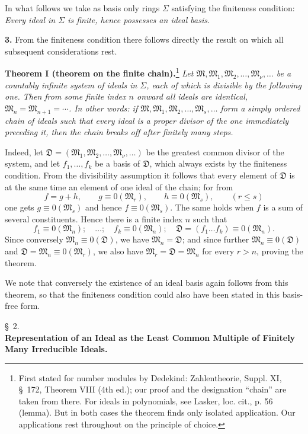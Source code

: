 \documentclass[11pt]{article}
\providecommand{\ideal}[1]{\mathfrak{#1}}
\begin{document}
In what follows we take as basis only rings $\Sigma$ satisfying the finiteness condition: \emph{Every ideal in $\Sigma$ is finite, hence possesses an ideal basis.}

\textbf{3.} From the finiteness condition there follows directly the result on which all subsequent considerations rest.

\textbf{Theorem I (theorem on the finite chain).}\footnote{First stated for number modules by Dedekind: Zahlentheorie, Suppl. XI, \S~172, Theorem VIII (4th ed.); our proof and the designation ``chain'' are taken from there. For ideals in polynomials, see Lasker, loc. cit., p. 56 (lemma). But in both cases the theorem finds only isolated application. Our applications rest throughout on the principle of choice.} \emph{Let $\ideal M,\ideal M_1,\ideal M_2,\ldots,\ideal M_\nu,\ldots$ be a countably infinite system of ideals in $\Sigma$, each of which is divisible by the following one. Then from some finite index $n$ onward all ideals are identical, $\ideal M_n=\ideal M_{n+1}=\cdots$. In other words: if $\ideal M,\ideal M_1,\ideal M_2,\ldots,\ideal M_s,
\ldots$ form a simply ordered chain of ideals such that every ideal is a proper divisor of the one immediately preceding it, then the chain breaks off after finitely many steps.}

Indeed, let $\ideal D=(\ideal M_1,\ideal M_2,\ldots,\ideal M_\nu,\ldots)$ be the greatest common divisor of the system, and let $f_1,\ldots,f_k$ be a basis of $\ideal D$, which always exists by the finiteness condition. From the divisibility assumption it follows that every element of $\ideal D$ is at the same time an element of one ideal of the chain; for from
\[
 f=g+h,\qquad g\equiv0(\ideal M_r),\qquad h\equiv0(\ideal M_s),\qquad (r\le s)
\]
one gets $g\equiv0(\ideal M_s)$ and hence $f\equiv0(\ideal M_s)$. The same holds when $f$ is a sum of several constituents. Hence there is a finite index $n$ such that
\[
 f_1\equiv0(\ideal M_n);\quad\ldots;\quad f_k\equiv0(\ideal M_n);\quad
 \ideal D=(f_1\ldots f_k)\equiv0(\ideal M_n).
\]
Since conversely $\ideal M_n\equiv0(\ideal D)$, we have $\ideal M_n=\ideal D$; and since further $\ideal M_n\equiv0(\ideal D)$ and $\ideal D=\ideal M_n\equiv0(\ideal M_r)$, we also have $\ideal M_r=\ideal D=\ideal M_n$ for every $r>n$, proving the theorem.

We note that conversely the existence of an ideal basis again follows from this theorem, so that the finiteness condition could also have been stated in this basis-free form.

\begin{center}
\S~2.\\[0.25em]
\textbf{Representation of an Ideal as the Least Common Multiple of Finitely Many Irreducible Ideals.}
\end{center}
\end{document}
